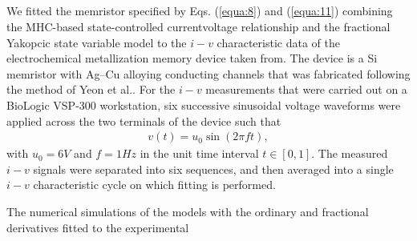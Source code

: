 \documentclass[10pt]{article}
\begin{document}
\begin{multicols}{2}
{        \section{ }
        }
        We fitted the memristor specified by Eqs. (\ref{equa:8}) and (\ref{equa:11}) combining the MHC-based state-controlled currentvoltage relationship and the fractional Yakopcic state variable model to the $i-v$ characteristic data of the electrochemical metallization memory device taken from. The device is a Si memristor with Ag–Cu alloying conducting channels that was fabricated following the method of Yeon et al.. For the $i-v$ measurements that were carried out on a BioLogic VSP-300 workstation, six successive sinusoidal voltage waveforms were applied across the two terminals of the device such that
        \begin{align}
            v(t) = u_0 \sin(2\pi ft), \label{equa:27}
        \end{align}
        with $u_0 = 6 V$ and $f = 1 Hz$ in the unit time interval $t \in [0,1]$. The measured $i-v$ signals were separated into six sequences, and then averaged into a single $i-v$ characteristic cycle on which fitting is performed. \par
        The numerical simulations of the models with the ordinary and fractional derivatives fitted to the experimental


\end{multicols}
\end{document}
